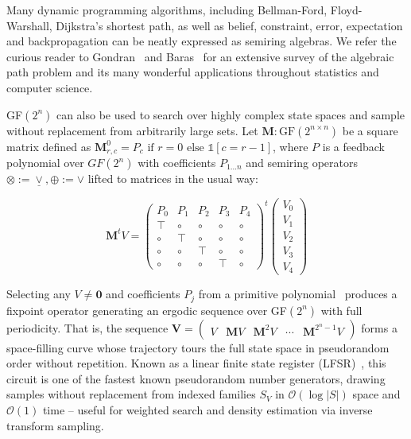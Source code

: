 \documentclass[sigplan,10pt,review,anonymous]{acmart}
\begin{document}
\noindent Many dynamic programming algorithms, including Bellman-Ford, Floyd-Warshall, Dijkstra's shortest path, as well as belief, constraint, error, expectation and backpropagation can be neatly expressed as semiring algebras. We refer the curious reader to Gondran~\citep{gondran2008graphs} and Baras~\citep{baras2010path} for an extensive survey of the algebraic path problem and its many wonderful applications throughout statistics and computer science.

GF$(2^n)$ can also be used to search over highly complex state spaces and sample without replacement from arbitrarily large sets. Let $\textbf{M}: \text{GF}(2^{n\times n})$ be a square matrix defined as $\mathbf{M}^0_{r, c} = P_c \text{ if } r=0 \text{ else } \mathds{1}[c = r - 1]$, where $P$ is a feedback polynomial over $GF(2^n)$ with coefficients $P_{1\ldots n}$ and semiring operators $\otimes := \underline{\vee}, \oplus := \vee$ lifted to matrices in the usual way:

\vspace{-7}
\[
\mathbf{M}^tV = \begin{pmatrix}
  P_0 & P_1 & P_2 & P_3 & P_4 \\
  \top & \circ & \circ & \circ & \circ \\
  \circ & \top & \circ & \circ & \circ \\
  \circ & \circ & \top & \circ & \circ \\
  \circ & \circ & \circ & \top & \circ
\end{pmatrix}^t
\begin{pmatrix}
      V_0 \\
      V_1 \\
      V_2 \\
      V_3 \\
      V_4
\end{pmatrix}
\]

Selecting any $V \neq \mathbf{0}$ and coefficients $P_j$ from a primitive polynomial~\citep{saxena2004primitive} produces a fixpoint operator generating an ergodic sequence over GF$(2^n)$ with full periodicity. That is, the sequence $\mathbf{V} = \begin{pmatrix}V & \mathbf{M}V & \mathbf{M}^{2}V & \cdots & \mathbf{M}^{2^n-1}V \end{pmatrix}$ forms a space-filling curve whose trajectory tours the full state space in pseudorandom order without repetition. Known as a linear finite state register (LFSR)~\citep{klein2013linear}, this circuit is one of the fastest known pseudorandom number generators, drawing samples without replacement from indexed families $S_V$ in $\mathcal{O}(\log |S|)$ space and $\mathcal{O}(1)$ time -- useful for weighted search and density estimation via inverse transform sampling.
\end{document}
